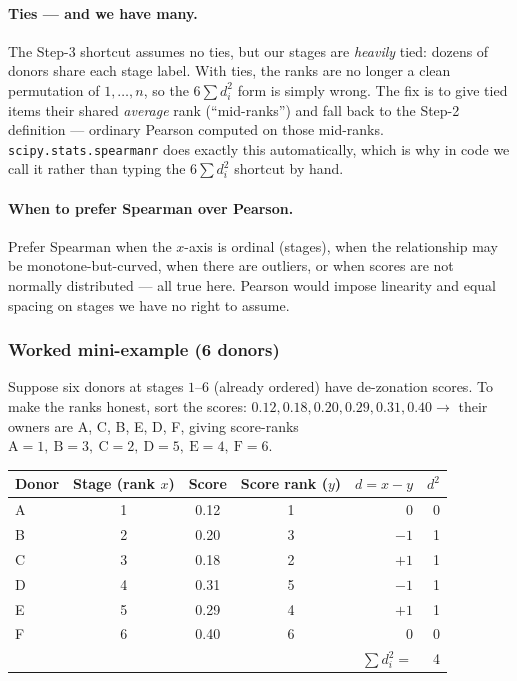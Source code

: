 \documentclass[11pt]{article}
\begin{document}
\paragraph{Ties --- and we have many.} The Step-3 shortcut assumes no ties, but our stages are \emph{heavily} tied: dozens of donors share each stage label. With ties, the ranks are no longer a clean permutation of $1,\dots,n$, so the $6\sum d_i^2$ form is simply wrong. The fix is to give tied items their shared \emph{average} rank (``mid-ranks'') and fall back to the Step-2 definition --- ordinary Pearson computed on those mid-ranks. \texttt{scipy.stats.spearmanr} does exactly this automatically, which is why in code we call it rather than typing the $6\sum d_i^2$ shortcut by hand.

\paragraph{When to prefer Spearman over Pearson.} Prefer Spearman when the $x$-axis is ordinal (stages), when the relationship may be monotone-but-curved, when there are outliers, or when scores are not normally distributed --- all true here. Pearson would impose linearity and equal spacing on stages we have no right to assume.

\subsubsection*{Worked mini-example (6 donors)}

Suppose six donors at stages $1$--$6$ (already ordered) have de-zonation scores. To make the ranks honest, sort the scores: $0.12, 0.18, 0.20, 0.29, 0.31, 0.40 \rightarrow$ their owners are A, C, B, E, D, F, giving score-ranks $\text{A}=1,\ \text{B}=3,\ \text{C}=2,\ \text{D}=5,\ \text{E}=4,\ \text{F}=6$.

\begin{center}
\begin{tabular}{lcccrr}
\toprule
Donor & Stage (rank $x$) & Score & Score rank ($y$) & $d = x-y$ & $d^2$ \\
\midrule
A & 1 & 0.12 & 1 & $0$  & 0 \\
B & 2 & 0.20 & 3 & $-1$ & 1 \\
C & 3 & 0.18 & 2 & $+1$ & 1 \\
D & 4 & 0.31 & 5 & $-1$ & 1 \\
E & 5 & 0.29 & 4 & $+1$ & 1 \\
F & 6 & 0.40 & 6 & $0$  & 0 \\
\midrule
\multicolumn{5}{r}{$\sum d_i^2 =$} & 4 \\
\bottomrule
\end{tabular}
\end{center}
\end{document}
